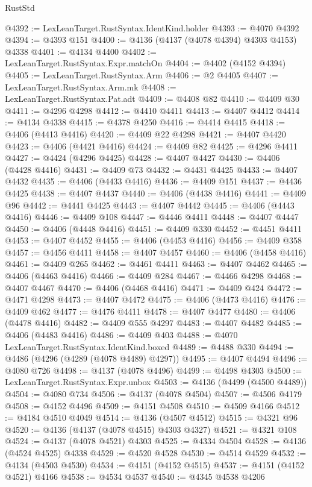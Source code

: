 \begin{lexlean}{RustStd}
\begin{coremodule}
@4392 := LexLeanTarget.RustSyntax.IdentKind.holder
@4393 := @4070 @4392
@4394 := @4393 @151
@4400 := @4136 (@4137 (@4078 @4394) @4303 @4153) @4338
@4401 := @4134 @4400
@4402 := LexLeanTarget.RustSyntax.Expr.matchOn
@4404 := @4402 (@4152 @4394)
@4405 := LexLeanTarget.RustSyntax.Arm
@4406 := @2 @4405
@4407 := LexLeanTarget.RustSyntax.Arm.mk
@4408 := LexLeanTarget.RustSyntax.Pat.adt
@4409 := @4408 @82
@4410 := @4409 @30
@4411 := @4296 @4298
@4412 := @4410 @4411
@4413 := @4407 @4412
@4414 := @4134 @4338
@4415 := @4378 @4250
@4416 := @4414 @4415
@4418 := @4406 (@4413 @4416)
@4420 := @4409 @22 @4298
@4421 := @4407 @4420
@4423 := @4406 (@4421 @4416)
@4424 := @4409 @82
@4425 := @4296 @4411
@4427 := @4424 (@4296 @4425)
@4428 := @4407 @4427
@4430 := @4406 (@4428 @4416)
@4431 := @4409 @73
@4432 := @4431 @4425
@4433 := @4407 @4432
@4435 := @4406 (@4433 @4416)
@4436 := @4409 @151
@4437 := @4436 @4425
@4438 := @4407 @4437
@4440 := @4406 (@4438 @4416)
@4441 := @4409 @96
@4442 := @4441 @4425
@4443 := @4407 @4442
@4445 := @4406 (@4443 @4416)
@4446 := @4409 @108
@4447 := @4446 @4411
@4448 := @4407 @4447
@4450 := @4406 (@4448 @4416)
@4451 := @4409 @330
@4452 := @4451 @4411
@4453 := @4407 @4452
@4455 := @4406 (@4453 @4416)
@4456 := @4409 @358
@4457 := @4456 @4411
@4458 := @4407 @4457
@4460 := @4406 (@4458 @4416)
@4461 := @4409 @265
@4462 := @4461 @4411
@4463 := @4407 @4462
@4465 := @4406 (@4463 @4416)
@4466 := @4409 @284
@4467 := @4466 @4298
@4468 := @4407 @4467
@4470 := @4406 (@4468 @4416)
@4471 := @4409 @424
@4472 := @4471 @4298
@4473 := @4407 @4472
@4475 := @4406 (@4473 @4416)
@4476 := @4409 @462
@4477 := @4476 @4411
@4478 := @4407 @4477
@4480 := @4406 (@4478 @4416)
@4482 := @4409 @555 @4297
@4483 := @4407 @4482
@4485 := @4406 (@4483 @4416)
@4486 := @4409 @403
@4488 := @4070 LexLeanTarget.RustSyntax.IdentKind.boxed
@4489 := @4488 @330
@4494 := @4486 (@4296 (@4289 (@4078 @4489) @4297))
@4495 := @4407 @4494
@4496 := @4080 @726
@4498 := @4137 (@4078 @4496)
@4499 := @4498 @4303
@4500 := LexLeanTarget.RustSyntax.Expr.unbox
@4503 := @4136 (@4499 (@4500 @4489))
@4504 := @4080 @734
@4506 := @4137 (@4078 @4504)
@4507 := @4506 @4179
@4508 := @4152 @4496
@4509 := @4151 @4508
@4510 := @4509 @4166
@4512 := @4184 @4510 @4049
@4514 := @4136 (@4507 @4512)
@4515 := @4321 @96
@4520 := @4136 (@4137 (@4078 @4515) @4303 @4327)
@4521 := @4321 @108
@4524 := @4137 (@4078 @4521) @4303
@4525 := @4334 @4504
@4528 := @4136 (@4524 @4525) @4338
@4529 := @4520 @4528
@4530 := @4514 @4529
@4532 := @4134 (@4503 @4530)
@4534 := @4151 (@4152 @4515)
@4537 := @4151 (@4152 @4521) @4166
@4538 := @4534 @4537
@4540 := @4345 @4538 @4206

\end{coremodule}
\end{lexlean}
